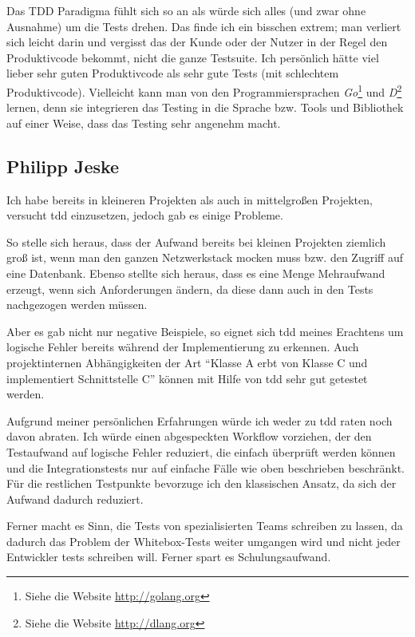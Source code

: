 \documentclass[a4paper,10pt]{scrartcl}
\newcommand{\pje}{\marginpar{Philipp\\Jeske}}
\begin{document}
Das TDD Paradigma fühlt sich so an als würde sich alles (und zwar ohne
Ausnahme) um die Tests drehen. Das finde ich ein bisschen extrem; man verliert
sich leicht darin und vergisst das der Kunde oder der Nutzer in der Regel den
Produktivcode bekommt, nicht die ganze Testsuite. Ich persönlich hätte viel
lieber sehr guten Produktivcode als sehr gute Tests (mit schlechtem
Produktivcode). Vielleicht kann man von den Programmiersprachen
\emph{Go}\footnote{Siehe die Website \url{http://golang.org}} und
\emph{D}\footnote{Siehe die Website \url{http://dlang.org}} lernen, denn
sie integrieren das Testing in die Sprache bzw. Tools und Bibliothek auf einer
Weise, dass das Testing sehr angenehm macht.

\subsection{Philipp Jeske}\label{Erfahrungsbericht Philipp}\pje
Ich habe bereits in kleineren Projekten als auch in mittelgroßen Projekten,
versucht \gls{tdd} einzusetzen, jedoch gab es einige Probleme.

So stelle sich heraus, dass der Aufwand bereits bei kleinen Projekten ziemlich
groß ist, wenn man den ganzen Netzwerkstack mocken muss bzw. den Zugriff auf
eine Datenbank. Ebenso stellte sich heraus, dass es eine Menge Mehraufwand
erzeugt, wenn sich Anforderungen ändern, da diese dann auch in den Tests
nachgezogen werden müssen.

Aber es gab nicht nur negative Beispiele, so eignet sich \gls{tdd} meines
Erachtens um logische Fehler bereits während der Implementierung zu erkennen.
Auch projektinternen Abhängigkeiten der Art "`Klasse A erbt von
Klasse C und implementiert Schnittstelle C"' können mit Hilfe von \gls{tdd}
sehr gut getestet werden.

Aufgrund meiner persönlichen Erfahrungen würde ich weder zu \gls{tdd} raten
noch davon abraten. Ich würde einen abgespeckten Workflow vorziehen, der den
Testaufwand auf logische Fehler reduziert, die einfach überprüft werden können
und die Integrationstests nur auf einfache Fälle wie oben beschrieben
beschränkt. Für die restlichen Testpunkte bevorzuge ich den klassischen Ansatz,
da sich der Aufwand dadurch reduziert.

Ferner macht es Sinn, die Tests von spezialisierten Teams schreiben zu lassen,
da dadurch das Problem der Whitebox-Tests weiter umgangen wird und nicht jeder
Entwickler tests schreiben will. Ferner spart es Schulungsaufwand.

\printbibliography
%
%

\printglossary
\end{document}
